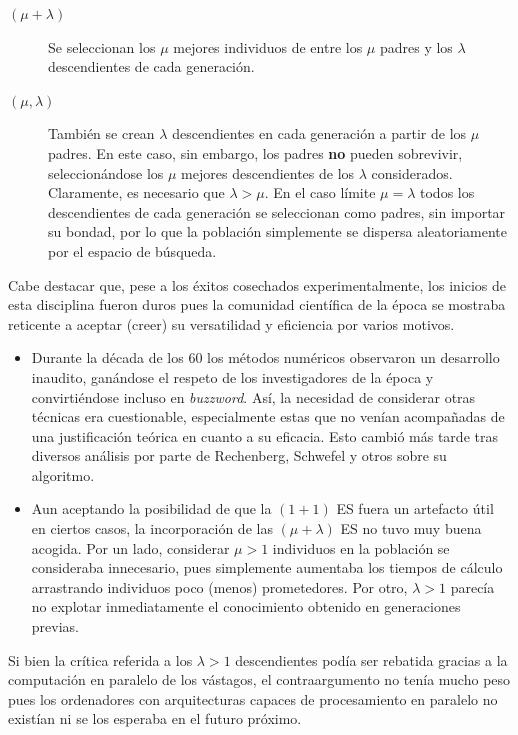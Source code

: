 \documentclass[12pt]{article} \usepackage[utf8]{inputenc}
\begin{document}
\begin{description}
\item[$(\mu + \lambda)$] Se seleccionan los $\mu$
  mejores individuos de entre los $\mu$ padres y los $\lambda$
  descendientes de cada generación.
\item[$(\mu, \lambda)$] También se crean $\lambda$ descendientes en
  cada generación a partir de los $\mu$ padres. En este caso, sin
  embargo, los padres \textbf{no} pueden sobrevivir, seleccionándose
  los $\mu$ mejores descendientes de los $\lambda$
  considerados. Claramente, es necesario que $\lambda > \mu$. En el
  caso límite $\mu = \lambda$ todos los descendientes de cada
  generación se seleccionan como padres, sin importar su bondad, por
  lo que la población simplemente se dispersa aleatoriamente por el
  espacio de búsqueda.
\end{description}

Cabe destacar que, pese a los éxitos cosechados experimentalmente, los
inicios de esta disciplina fueron duros pues la comunidad científica
de la época se mostraba reticente a aceptar (creer) su versatilidad y
eficiencia por varios motivos.

\begin{itemize}
\item Durante la década de los 60 los métodos numéricos observaron un
  desarrollo inaudito, ganándose el respeto de los investigadores de
  la época y convirtiéndose incluso en \textit{buzzword}. Así, la
  necesidad de considerar otras técnicas era cuestionable,
  especialmente estas que no venían acompañadas de una justificación
  teórica en cuanto a su eficacia. Esto cambió más tarde tras diversos
  análisis por parte de Rechenberg, Schwefel y otros sobre su
  algoritmo.
\item Aun aceptando la posibilidad de que la $(1 + 1)$ ES fuera un
  artefacto útil en ciertos casos, la incorporación de las $(\mu +
  \lambda)$ ES no tuvo muy buena acogida. Por un lado, considerar $\mu >
  1$ individuos en la población se consideraba innecesario, pues
  simplemente aumentaba los tiempos de cálculo arrastrando individuos
  poco (menos) prometedores. Por otro, $\lambda > 1$ parecía no
  explotar inmediatamente el conocimiento obtenido en generaciones previas.
\end{itemize}

Si bien la crítica referida a los $\lambda > 1$ descendientes podía ser
rebatida gracias a la computación en paralelo de los vástagos, el
contraargumento no tenía mucho peso pues los ordenadores con
arquitecturas capaces de procesamiento en paralelo no existían ni se
los esperaba en el futuro próximo. \\
\end{document}
